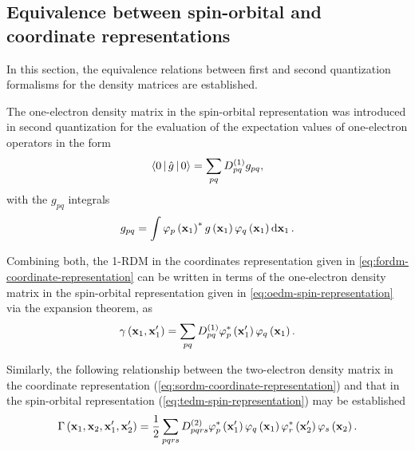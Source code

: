 \subsection{Equivalence between spin-orbital and coordinate representations}
In this section, the equivalence relations between first and second quantization
formalisms for the density matrices are established.


The one-electron density matrix in the spin-orbital representation was
introduced in second quantization for the evaluation of the expectation values
of one-electron operators in the form 
\begin{equation}
    \Braket{0 | \hat{g} | 0} =
    \sum_{pq} \oedm_{pq} g_{pq}
    ,
\end{equation}
with the $g_{pq}$ integrals 
\begin{equation}
    g_{pq} = \int
    \varphi_p \left( \boldsymbol{\mathrm{x}}_1 \right)^{*} 
    g \left( \boldsymbol{\mathrm{x}}_1 \right) 
    \varphi_q \left( \boldsymbol{\mathrm{x}}_1 \right)
    \dd{ \boldsymbol{\mathrm{x}}_1}
    .
\end{equation}

Combining both, the 1-RDM in the coordinates representation given in 
\cref{eq:fordm-coordinate-representation} can be written
in terms of the one-electron density matrix in the spin-orbital representation
given in \cref{eq:oedm-spin-representation} via the expansion theorem, as
\begin{equation}
    \gamma \left( \boldsymbol{\mathrm{x}}_1, \boldsymbol{\mathrm{x}}_1^{\prime} \right) =
    \sum_{pq} D^{\left( 1 \right)}_{pq} 
    \varphi_p^{*} \left( \boldsymbol{\mathrm{x}}_1^{\prime} \right)
    \varphi_q \left( \boldsymbol{\mathrm{x}}_1 \right)
    .
\end{equation}

Similarly, the following relationship between the two-electron density matrix
in the coordinate representation (\cref{eq:sordm-coordinate-representation}) 
and that in the spin-orbital representation (\cref{eq:tedm-spin-representation})
may be established
\begin{equation}
    \Gamma \left( \boldsymbol{\mathrm{x}}_1, \boldsymbol{\mathrm{x}}_2, \boldsymbol{\mathrm{x}}_1^{\prime}, \boldsymbol{\mathrm{x}}_2^{\prime} \right)
    =
    \frac{1}{2} \sum_{pqrs} D^{\left( 2 \right)}_{pqrs}
    \varphi_p^{*}\left( \boldsymbol{\mathrm{x}}_1^{\prime} \right)
    \varphi_q    \left( \boldsymbol{\mathrm{x}}_1          \right)
    \varphi_r^{*}\left( \boldsymbol{\mathrm{x}}_2^{\prime} \right)
    \varphi_s    \left( \boldsymbol{\mathrm{x}}_2          \right)
    .
\end{equation}

